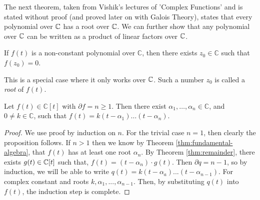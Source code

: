 The next theorem, taken from Vishik's lectures of 'Complex Functions' \cite{complex-functions-uon} and is stated without proof (and proved later on with Galois Theory), states that every polynomial over $\mathbb C$ has a root over $\mathbb C$. We can further show that any polynomial over $\mathbb C$ can be written as a product of linear factors over $\mathbb C$. 


\begin{theorem} \label{thm:fundamental-algebra}
    If $f(t)$ is a non-constant polynomial over $\mathbb{C}$, then there exists $z_0 \in \mathbb{C}$ such that $f\left(z_0\right)=0$.
\end{theorem}

This is a special case where it only works over $\mathbb C$. Such a number $z_0$ is called a \textit{root} of $f(t)$. 

\begin{theorem} \label{thm:fundamental-algebra-2}
	Let $f(t) \in \mathbb{C}[t]$ with $\partial f=n \geq 1$. Then there exist $\alpha_1, \ldots, \alpha_n \in \mathbb{C}$, and $0 \neq k \in \mathbb{C}$, such that
	$
	f(t)=k\left(t-\alpha_1\right) \ldots\left(t-\alpha_n\right).
	$
\end{theorem}

\begin{proof}
	We use proof by induction on $n$. For the trivial case $n = 1$, then clearly the proposition follows. If $n > 1$ then we know by Theorem \ref{thm:fundamental-algebra}, that $f(t)$ has at least one root $\alpha_n$. By Theorem \ref{thm:remainder}, there exists $g(t) \in \mathbb C[t]$ such that,
		$f(t) = (t-\alpha_n)\cdot g(t)$. 
	Then $\partial q = n - 1$, so by induction, we will be able to write
		$q(t) = k(t-\alpha_a)...(t-\alpha_{n-1})$. 
	For complex constant and roots $k,\alpha_1,...,\alpha_{n-1}$. Then, by substituting $q(t)$ into $f(t)$, the induction step is complete.
\end{proof}